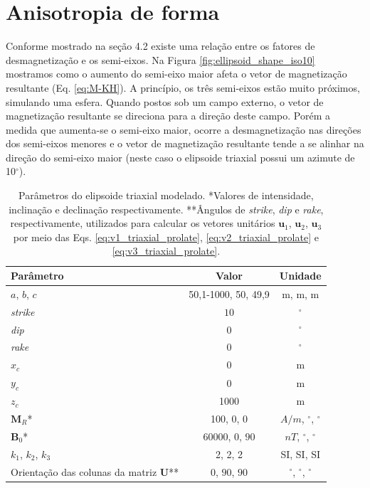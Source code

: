 \section{Anisotropia de forma}

Conforme mostrado na seção 4.2 existe uma relação entre os fatores de desmagnetização e os semi-eixos. Na Figura \ref{fig:ellipsoid_shape_iso10} mostramos como o aumento do semi-eixo maior afeta o vetor de magnetização resultante (Eq. \ref{eq:M-KH}). A princípio, os três semi-eixos estão muito próximos, simulando uma esfera. Quando postos sob um campo externo, o vetor de magnetização resultante se direciona para a direção deste campo. Porém a medida que aumenta-se o semi-eixo maior, ocorre a desmagnetização nas direções dos semi-eixos menores e o vetor de magnetização resultante tende a se alinhar na direção do semi-eixo maior (neste caso o elipsoide triaxial possui um azimute de 10$^{\circ}$).

\vspace{2cm}

\begin{table}[h!]
	\begin{center}
		\begin{tabular}{|l|c|c|}
			\hline
			\textbf{Parâmetro}  & \textbf{Valor}  & \textbf{Unidade }\\
			\hline 
			$a$, $b$, $c$  & 50,1-1000, 50, 49,9 & m, m, m\\
			\hline
			\textit{strike}   & $10$ & $^{\circ}$\\
			\hline
			\textit{dip}    & $0$ & $^{\circ}$\\
			\hline
			\textit{rake}   & $0$  & $^{\circ}$\\
			\hline
			$x_c$   & 0  & m\\
			\hline          
			$y_c$   & 0  & m\\
			\hline                
			$z_c$   & 1000  & m\\
			\hline
			$\mathbf{M}_{R}$*  & 100, $0$, $0$ & $A/m$, $^{\circ}$, $^{\circ}$ \\
			\hline
			$\mathbf{B}_{0}$*   & 60000, $0$, $90$ & $nT$, $^{\circ}$, $^{\circ}$\\
			\hline
			$k_{1}$, $k_{2}$, $k_{3}$   & 2, 2, 2  & SI, SI, SI\\
			\hline
			Orientação das colunas da matriz $\mathbf{U}$**   & $0$, $90$, $90$  & $^{\circ}$,  $^{\circ}$,  $^{\circ}$\\
			\hline
		\end{tabular}
		\caption{Parâmetros do elipsoide triaxial modelado. *Valores de intensidade, inclinação e declinação respectivamente. **Ângulos de \textit{strike}, \textit{dip}  e \textit{rake}, respectivamente, utilizados para calcular os vetores unitários $\mathbf{u}_{1}$, $\mathbf{u}_{2}$, $\mathbf{u}_{3}$ por meio das Eqs. \ref{eq:v1_triaxial_prolate}, \ref{eq:v2_triaxial_prolate} e \ref{eq:v3_triaxial_prolate}.}
	\end{center}
	\label{tab:ellipsoid_shape_iso10}
\end{table}

